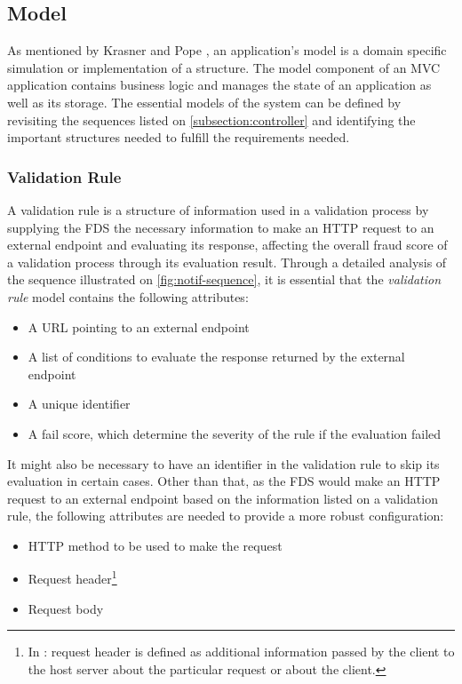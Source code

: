 \subsection{Model}
  \label{subsection:model}

  As mentioned by Krasner and Pope \autocite{krasner-pope-88}, an application's model is a domain specific simulation or implementation of a structure. The model component of an MVC application contains business logic and manages the state of an application as well as its storage. 
  The essential models of the system can be defined by revisiting the sequences listed on \autoref{subsection:controller} and identifying the important structures needed to fulfill the requirements needed.
  
  \subsubsection{Validation Rule}
    \label{subsub:rule}

    A validation rule is a structure of information used in a validation process by supplying the FDS the necessary information to make an HTTP request to an external endpoint and evaluating its response, affecting the overall fraud score of a validation process through its evaluation result. Through a detailed analysis of the sequence illustrated on \autoref{fig:notif-sequence}, it is essential that the \emph{validation rule} model contains the following attributes:

    \begin{itemize}
      \item A URL pointing to an external endpoint
      \item A list of conditions to evaluate the response returned by the external endpoint
      \item A unique identifier
      \item A fail score, which determine the severity of the rule if the evaluation failed
    \end{itemize}

    It might also be necessary to have an identifier in the validation rule to skip its evaluation in certain cases. Other than that, as the FDS would make an HTTP request to an external endpoint based on the information listed on a validation rule, the following attributes are needed to provide a more robust configuration:

    \begin{itemize}
      \item HTTP method to be used to make the request
      \item Request header\footnote{In \autocite[\enquote{5.3 Request Header Fields}]{http-rfc}: request header is defined as additional information passed by the client to the host server about the particular request or about the client.}
      \item Request body
    \end{itemize}

